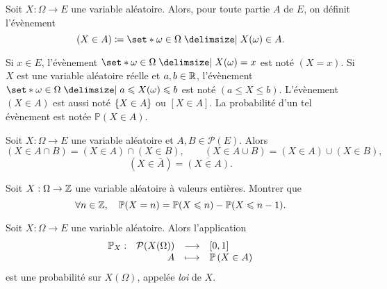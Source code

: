 \documentclass{magnolia}
\begin{document}
\begin{definition}
Soit $X:\Omega\to E$ une variable aléatoire. Alors, pour toute partie $A$ de $E$, on définit
l'évènement
\[(X\in A)\defeq\enstq{\omega\in\Omega}{X(\omega)\in A}.\] 
\end{definition}

\begin{remarques}
\remarque Si $x\in E$, l'évènement $\enstq{\omega\in\Omega}{X(\omega)=x}$ est noté
  $(X=x)$.
\remarque Si $X$ est une variable aléatoire réelle et $a,b\in\mathbb{R}$, l'évènement
  $\enstq{\omega\in\Omega}{a\leq X(\omega)\leq b}$ est noté $(a\leq X\leq b)$. 
\remarque L'évènement $(X\in A)$ est aussi noté $\left\{X\in A\right\}$ ou $[X\in A]$. La probabilité
  d'un tel évènement est notée $\mathbb{P}(X\in A)$.
\end{remarques}

\begin{proposition}
Soit $X:\Omega\to E$ une variable aléatoire et $A,B\in\mathcal{P}(E)$. Alors
\[(X\in A\cap B)=(X\in A)\cap(X\in B), \qquad (X\in A\cup B)=(X\in A)\cup(X\in B),\]
\[(X\in \bar{A})=\overline{(X\in A)}.\]
\end{proposition}

\begin{exoUnique}
\exo Soit $X:\Omega\to\mathbb{Z}$ une variable aléatoire à valeurs entières. Montrer que
  \[\forall n\in\mathbb{Z},\quad \mathbb{P}(X=n)=\mathbb{P}(X\leqslant n) - \mathbb{P}(X\leqslant n-1).\]
\end{exoUnique}


\begin{definition}
Soit $X:\Omega\to E$ une variable aléatoire. Alors l'application
\[\begin{array}[t]{lrcl} \displaystyle{\mathbb{P}_X} : & \displaystyle{\mathcal{P}(X(\Omega))} & \longrightarrow & \displaystyle{\left[0,1\right]} \\ & \displaystyle{A} & \longmapsto & \displaystyle{\mathbb{P}\left(X\in A\right)} \end{array}\]
est une probabilité sur $X(\Omega)$, appelée \emph{loi} de $X$.
\end{definition}
\end{document}
